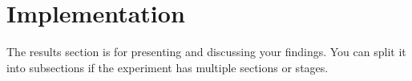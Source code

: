 \section{Implementation}
The results section is for presenting and discussing your findings.  You can split it into subsections if the experiment has multiple sections or stages.

